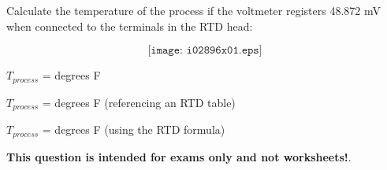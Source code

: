 

Calculate the temperature of the process if the voltmeter registers 48.872 mV when connected to the terminals in the RTD head:

$$\texttt{[image: i02896x01.eps]}$$

$T_{process}$ = \underbar{\hskip 50pt} degrees F







$T_{process}$ =  degrees F (referencing an RTD table)
 
\vskip 10pt

$T_{process}$ =  degrees F (using the RTD formula)
 






{\bf This question is intended for exams only and not worksheets!}.



